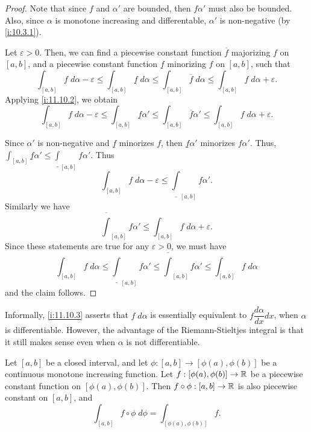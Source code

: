 \begin{proof}
  Note that since \(f\) and \(\alpha'\) are bounded, then \(f \alpha'\) must also be bounded.
  Also, since \(\alpha\) is monotone increasing and differentable, \(\alpha'\) is non-negative (by \cref{i:10.3.1}).

  Let \(\varepsilon > 0\).
  Then, we can find a piecewise constant function \(\overline{f}\) majorizing \(f\) on \([a, b]\), and a piecewise constant function \(\underline{f}\) minorizing \(f\) on \([a, b]\), such that
  \[
    \int_{[a, b]} f \; d \alpha - \varepsilon \leq \int_{[a, b]} \underline{f} \; d \alpha \leq \int_{[a, b]} \overline{f} \; d \alpha \leq \int_{[a, b]} f \; d \alpha + \varepsilon.
  \]
  Applying \cref{i:11.10.2}, we obtain
  \[
    \int_{[a, b]} f \; d \alpha - \varepsilon \leq \int_{[a, b]} \underline{f} \alpha' \leq \int_{[a, b]} \overline{f} \alpha' \leq \int_{[a, b]} f \; d \alpha + \varepsilon.
  \]

  Since \(\alpha'\) is non-negative and \(\underline{f}\) minorizes \(f\), then \(\underline{f} \alpha'\) minorizes \(f \alpha'\).
  Thus, \(\int_{[a, b]} \underline{f} \alpha' \leq \underline{\int}_{[a, b]} f \alpha'\).
  Thus
  \[
    \int_{[a, b]} f \; d \alpha - \varepsilon \leq \underline{\int}_{[a, b]} f \alpha'.
  \]
  Similarly we have
  \[
    \overline{\int}_{[a, b]} f \alpha' \leq \int_{[a, b]} f \; d \alpha + \varepsilon.
  \]
  Since these statements are true for any \(\varepsilon > 0\), we must have
  \[
    \int_{[a, b]} f \; d \alpha \leq \underline{\int}_{[a, b]} f \alpha' \leq \overline{\int}_{[a, b]} f \alpha' \leq \int_{[a, b]} f \; d \alpha
  \]
  and the claim follows.
\end{proof}

\begin{rmk}\label{i:11.10.4}
  Informally, \cref{i:11.10.3} asserts that \(f \; d \alpha\) is essentially equivalent to \(f \dfrac{d \alpha}{dx} dx\), when \(\alpha\) is differentiable.
  However, the advantage of the Riemann-Stieltjes integral is that it still makes sense even when \(\alpha\) is not differentiable.
\end{rmk}

\begin{lem}\label{i:11.10.5}
  Let \([a, b]\) be a closed interval, and let \(\phi : [a, b] \to [\phi(a), \phi(b)]\) be a continuous monotone increasing function.
  Let \(f : [\phi(a), \phi(b)] \to \mathbb{R}\) be a piecewise constant function on \([\phi(a), \phi(b)]\).
  Then \(f \circ \phi : [a, b] \to \mathbb{R}\) is also piecewise constant on \([a, b]\), and
  \[
    \int_{[a, b]} f \circ \phi \; d \phi = \int_{[\phi(a), \phi(b)]} f.
  \]
\end{lem}

